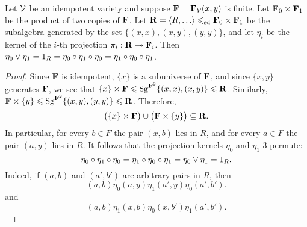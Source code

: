 \begin{lemma}
  \label{lem:absorpt-theor-bk}
  Let $\mathcal{V}$ be an idempotent variety and suppose
  $\mathbf{F} = \mathbf{F}_{\mathcal{V}}(x,y)$ is finite.
  Let $\mathbf{F}_0 \times \mathbf{F}_1$ be the product of two copies of $\mathbf{F}$.
  Let $\bR = \<R, \dots\>  \sdp \bF_0 \times \bF_1$ be the subalgebra generated
     by the set $\{(x, x), (x, y), (y, y)\}$, and let $\eta_i$ be the kernel of the
  $i$-th projection $\pi_i: \mathbf{R} \twoheadrightarrow \mathbf{F}_i$.  Then 
  $\eta_0 \vee \eta_1 = 1_R = \eta_0 \circ \eta_1 \circ \eta_0 = 
  \eta_1 \circ \eta_0 \circ \eta_1$.
\end{lemma}
\begin{proof}


  Since $\mathbf{F}$ is idempotent, $\{x\}$ is a subuniverse of $\mathbf{F}$, and since
  $\{x, y\}$ generates $\mathbf{F}$, we see that
  $\{x\} \times \mathbf{F} \leqslant \operatorname{Sg}^{\mathbf{F}^2}\{(x,x), (x,y)\}\leqslant \mathbf{R}$.
  Similarly, $\mathbf{F}\times \{y\} \leqslant \operatorname{Sg}^{\mathbf{F}^2}\{(x,y), (y,y)\}\leqslant \mathbf{R}$.
  Therefore,
  \[
  \bigl(\{x\} \times \mathbf{F}\bigr) \cup \bigl(\mathbf{F} \times \{y\}\bigr) \subseteq \mathbf{R}.
  \]
  In particular, for every $b \in F$ the pair $(x,b)$ lies in $R$, and for every
  $a\in F$ the pair $(a,y)$ lies in $R$.
  It follows that the projection kernels $\eta_0$ and $\eta_1$ 3-permute:
  \[
  \eta_0 \circ \eta_1 \circ \eta_0 = 
  \eta_1 \circ \eta_0 \circ \eta_1 =
  \eta_0 \vee \eta_1 = 1_R.
  \]
  Indeed, if $(a,b)$ and $(a',b')$ are arbitrary pairs in $R$, then
  \[ (a,b) \mathrel{\eta_0} (a,y) \mathrel{\eta_1} (a',y) \mathrel{\eta_0} (a',b'). \]
  and
  \[ (a,b) \mathrel{\eta_1} (x,b) \mathrel{\eta_0} (x,b') \mathrel{\eta_1} (a',b'). \]
\end{proof}

